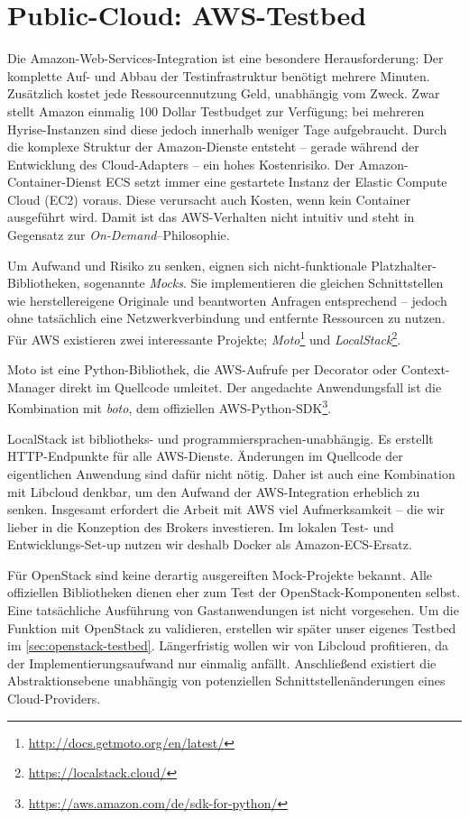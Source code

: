 \section{Public-Cloud: AWS-Testbed}
\label{sec:aws-testbed}

Die Amazon-Web-Services-Integration ist eine besondere Herausforderung: Der komplette Auf- und Abbau der Testinfrastruktur benötigt mehrere Minuten. Zusätzlich kostet jede Ressourcennutzung Geld, unabhängig vom Zweck. Zwar stellt Amazon einmalig 100 Dollar Testbudget zur Verfügung; bei mehreren Hyrise-Instanzen sind diese jedoch innerhalb weniger Tage aufgebraucht. Durch die komplexe Struktur der Amazon-Dienste entsteht -- gerade während der Entwicklung des Cloud-Adapters -- ein hohes Kostenrisiko. Der Amazon-Container-Dienst ECS setzt immer eine gestartete Instanz der Elastic Compute Cloud (EC2) voraus. Diese verursacht auch Kosten, wenn kein Container ausgeführt wird. Damit ist das AWS-Verhalten nicht intuitiv und steht in Gegensatz zur \emph{On-Demand}--Philosophie.

Um Aufwand und Risiko zu senken, eignen sich nicht-funktionale Platzhalter-Bibliotheken, sogenannte \emph{Mocks}. Sie implementieren die gleichen Schnittstellen wie herstellereigene Originale und beantworten Anfragen entsprechend -- jedoch ohne tatsächlich eine Netzwerkverbindung und entfernte Ressourcen zu nutzen. Für AWS existieren zwei interessante Projekte; \emph{Moto}\footnote{\url{http://docs.getmoto.org/en/latest/}} und \emph{LocalStack}\footnote{\url{https://localstack.cloud/}}. 

Moto ist eine Python-Bibliothek, die AWS-Aufrufe per Decorator oder Context-Manager direkt im Quellcode umleitet. Der angedachte Anwendungsfall ist die Kombination mit \emph{boto}, dem offiziellen AWS-Python-SDK\footnote{\url{https://aws.amazon.com/de/sdk-for-python/}}.

LocalStack ist  bibliotheks- und programmiersprachen-unabhängig. Es erstellt HTTP-Endpunkte für alle AWS-Dienste. Änderungen im Quellcode der eigentlichen Anwendung sind dafür nicht nötig. Daher ist auch eine Kombination mit Libcloud denkbar, um den Aufwand der AWS-Integration erheblich zu senken. Insgesamt erfordert die Arbeit mit AWS viel Aufmerksamkeit -- die wir lieber in die Konzeption des Brokers investieren. Im lokalen Test- und Entwicklungs-Set-up nutzen wir deshalb Docker als Amazon-ECS-Ersatz.

Für OpenStack sind keine derartig ausgereiften Mock-Projekte bekannt. Alle offiziellen Bibliotheken dienen eher zum Test der OpenStack-Komponenten selbst. Eine tatsächliche Ausführung von Gastanwendungen ist nicht vorgesehen. Um die Funktion mit OpenStack zu validieren, erstellen wir später unser eigenes Testbed im \autoref{sec:openstack-testbed}. Längerfristig wollen wir von Libcloud profitieren, da der Implementierungsaufwand nur einmalig anfällt. Anschließend existiert die Abstraktionsebene unabhängig von potenziellen Schnittstellenänderungen eines Cloud-Providers.
